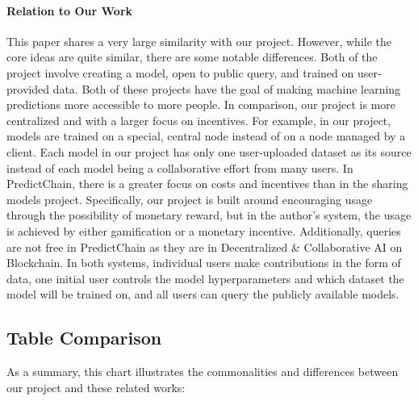 \documentclass{article}
\begin{document}
    \paragraph{Relation to Our Work}
    This paper shares a very large similarity with our project.  However, while the core ideas are quite similar, there
    are some notable differences.  Both of the project involve creating a model, open to public query, and trained on
    user-provided data.  Both of these projects have the goal of making machine learning predictions more accessible
    to more people.  In comparison, our project is more centralized and with a larger focus on incentives.  For
    example, in our project, models are trained on a special, central node instead of on a node managed by a client.
    Each model in our project has only one user-uploaded dataset as its source instead of each model being a collaborative
    effort from many users.  In PredictChain, there is a greater focus on costs and incentives than in the sharing models
    project.  Specifically, our project is built around encouraging usage through the possibility of monetary reward,
    but in the author's system, the usage is achieved by either gamification or a monetary incentive.  Additionally,
    queries are not free in PredictChain as they are in Decentralized \& Collaborative AI on Blockchain.  In both systems,
    individual users make contributions in the form of data, one initial user controls the model hyperparameters and
    which dataset the model will be trained on, and all users can query the publicly available models.

    \subsection{}

    \subsection{Table Comparison}

    As a summary, this chart illustrates the commonalities and differences between our project and these related works:
\end{document}
